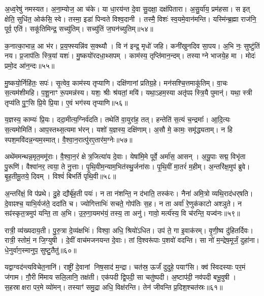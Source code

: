 अ॒ध्व॒रेषु॑ नमस्यत।
अ॒ना॒म्योज॒ आ च॑के।
या धा॒रय॑न्त दे॒वा सु॒दक्षा॒ दक्ष॑पितारा।
अ॒सु॒र्या॑य॒ प्रम॑हसा।
स इत् क्षेति॒ सुधि॑त॒ ओक॑सि॒ स्वे।
तस्मा॒ इडा॑ पिन्वते विश्व॒दानी।
तस्मै॒ विशः॑ स्व॒यमे॒वान॑मन्ति।
यस्मि॑न्ब्र॒ह्मा राज॑नि॒ पूर्व॒ एति॑।
सकू॑तिमिन्द्र॒ सच्यु॑तिम्।
सच्यु॑तिं ज॒घन॑च्युतिम्॥५४॥

क॒नात्का॒भान्न॒ आ भ॑र।
प्र॒य॒फ्स्यन्नि॑व स॒क्थ्यौ।
वि न॑ इन्द्र॒ मृधो॑ जहि।
कनी॑खुनदिव सा॒पय\sn{}।
अ॒भि नः॒ सुष्टु॑तिं नय।
प्र॒जाप॑तिः स्त्रि॒यां यशः॑।
मु॒ष्कयो॑रदधा॒थ्सपम्।
काम॑स्य॒ तृप्ति॑मान॒न्दम्।
तस्याग्ने भाजये॒ह मा।
मोदः॑ प्रमो॒द आ॑न॒न्दः॥५५॥

मु॒ष्कयो॒र्निहि॑तः॒ सपः॑।
सृ॒त्वेव॒ काम॑स्य तृप्याणि।
दक्षि॑णानां प्रतिग्र॒हे।
मन॑सश्चि॒त्तमाकू॑तिम्।
वा॒चः स॒त्यम॑शीमहि।
प॒शू॒नाꣳ रू॒पमन्न॑स्य।
यशः॒ श्रीः श्र॑यतां॒ मयि॑।
यथा॒ऽहम॒स्या अतृ॑पꣴ स्त्रि॒यै पुमान्॑।
यथा॒ स्त्री तृप्य॑ति पु॒ꣳ॒सि प्रि॒ये प्रि॒या।
ए॒वं भग॑स्य तृप्याणि॥५६॥

य॒ज्ञस्य॒ काम्यः॑ प्रि॒यः।
ददा॒मीत्य॒ग्निर्व॑दति।
तथेति॑ वा॒युरा॑ह॒ तत्।
हन्तेति॑ स॒त्यं च॒न्द्रमाः᳚।
आ॒दि॒त्यः स॒त्यमोमिति॑।
आप॒स्तथ्स॒त्यमा भ॑रन्।
यशो॑ य॒ज्ञस्य॒ दक्षि॑णाम्।
अ॒सौ मे॒ कामः॒ समृ॑द्ध्यताम्।
न हि स्पश॒मवि॑दन्न॒न्यम॒स्मात्।
वै॒श्वा॒न॒रात्पु॑रए॒तार॑म॒ग्नेः॥५७॥

अथे॑ममन्थन्न॒मृत॒ममू॑राः।
वै॒श्वा॒न॒रं क्षेत्र॒जित्या॑य दे॒वाः।
येषा॑मि॒मे पूर्वे॒ अर्मा॑स॒ आसन्।
अ॒यू॒पाः सद्म॒ विभृ॑ता पु॒रूणि॑।
वैश्वा॑नर॒ त्वया॒ ते नु॒त्ताः।
पृ॒थि॒वीम॒न्याम॒भित॑स्थु॒र्जना॑सः।
पृ॒थि॒वीं मा॒तरं॑ म॒हीम्।
अ॒न्तरि॑क्ष॒मुप॑ ब्रुवे।
बृ॒ह॒तीमू॒तये॒ दिवम्।
विश्वं॑ बिभर्ति पृथि॒वी॥५८॥

अ॒न्तरि॑क्षं॒ वि प॑प्रथे।
दु॒हे द्यौर्बृ॑ह॒ती पयः॑।
न ता न॑शन्ति॒ न द॑भाति॒ तस्क॑रः।
नैना॑ अमि॒त्रो व्यथि॒राद॑धर्‌\mbox{}षति।
दे॒वाꣴश्च॒ याभि॒र्यज॑ते॒ ददा॑ति च।
ज्योगित्ताभिः॑ सचते॒ गोप॑तिः स॒ह।
न ता अर्वा॑ रे॒णुक॑काटो अश्ञुते।
न सꣴ॑स्कृत॒त्रमुप॑ यन्ति॒ ता अ॒भि।
उ॒रु॒गा॒यमभ॑यं॒ तस्य॒ ता अनु॑।
गावो॒ मर्त्य॑स्य॒ वि च॑रन्ति॒ यज्व॑नः॥५९॥

रात्री॒ व्य॑ख्यदाय॒ती।
पु॒रु॒त्रा दे॒व्य॑क्षभिः॑।
विश्वा॒ अधि॒ श्रियो॑ऽधित।
उप॑ ते॒ गा इ॒वाक॑रम्।
वृ॒णी॒ष्व दु॑हितर्दिवः।
रात्री॒ स्तोमं॒ न जि॒ग्युषी।
दे॒वीं वाच॑मजनयन्त दे॒वाः।
तां वि॒श्वरू॑पाः प॒शवो॑ वदन्ति।
सा नो॑ म॒न्द्रेष॒मूर्जं॒ दुहा॑ना।
धे॒नुर्वाग॒स्मानुप॒ सुष्टु॒तैतु॑॥६०॥

यद्वाग्वद॑न्त्यविचेत॒नानि॑।
राष्ट्री॑ दे॒वानां निष॒साद॑ म॒न्द्रा।
चत॑स्र॒ ऊर्जं॑ दुदुहे॒ पयाꣳ॑सि।
क्व॑ स्विदस्याः पर॒मं ज॑गाम।
गौ॒री मि॑माय सलि॒लानि॒ तक्ष॑ती।
एक॑पदी द्वि॒पदी॒ सा चतु॑ष्पदी।
अ॒ष्टाप॑दी॒ नव॑पदी बभू॒वुषी।
स॒हस्राक्षरा पर॒मे व्यो॑मन्।
तस्याꣳ॑ समु॒द्रा अधि॒ विक्ष॑रन्ति।
तेन॑ जीवन्ति प्र॒दिश॒श्चत॑स्रः॥६१॥

